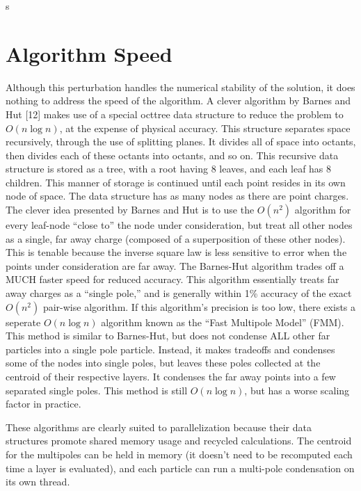 s\documentclass[10pt]{article}
\begin{document}
\section{Algorithm Speed}
Although this perturbation handles the numerical stability of the solution, it does nothing to address the speed of the algorithm. A clever algorithm by Barnes and Hut [12] makes use of a special octtree data structure to reduce the problem to $O(n \log n)$, at the expense of physical accuracy. This structure separates space recursively, through the use of splitting planes. It divides all of space into octants, then divides each of these octants into octants, and so on. This recursive data structure is stored as a tree, with a root having 8 leaves, and each leaf has 8 children. This manner of storage is continued until each point resides in its own node of space. The data structure has as many nodes as there are point charges. The clever idea presented by Barnes and Hut is to use the $O(n^2)$ algorithm for every leaf-node ``close to'' the node under consideration, but treat all other nodes as a single, far away charge (composed of a superposition of these other nodes). This is tenable because the inverse square law is less sensitive to error when the points under consideration are far away. The Barnes-Hut algorithm trades off a MUCH faster speed for reduced accuracy. This algorithm essentially treats far away charges as a ``single pole,'' and is generally within 1\% accuracy of the exact $O(n^2)$ pair-wise algorithm. If this algorithm's precision is too low, there exists a seperate $O(n \log n)$ algorithm known as the ``Fast Multipole Model'' (FMM). This method is similar to Barnes-Hut, but does not condense ALL other far particles into a single pole particle. Instead, it makes tradeoffs and condenses some of the nodes into single poles, but leaves these poles collected at the centroid of their respective layers. It condenses the far away points into a few separated single poles. This method is still $O(n \log n)$, but has a worse scaling factor in practice.

These algorithms are clearly suited to parallelization because their data structures promote shared memory usage and recycled calculations. The centroid for the multipoles can be held in memory (it doesn't need to be recomputed each time a layer is evaluated), and each particle can run a multi-pole condensation on its own thread. 
\end{document}
